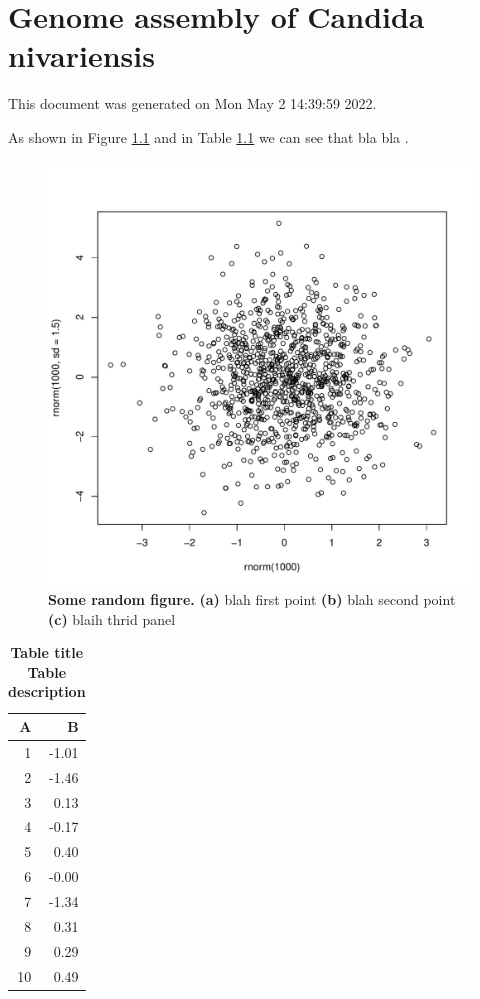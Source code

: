 \chapter{Genome assembly of Candida nivariensis}
\label{chap:rnw}





This document was generated on Mon May  2 14:39:59 2022.

As shown in Figure \ref{fig:myfig} and in Table \ref{tab:rtab1} we can see that bla bla \citep{B}.


\begin{figure}[!ht]
\centering
\includegraphics[width = 1\linewidth,keepaspectratio]{figure/myfig.pdf}
\caption[Some random figure]{{\bf Some random figure.} {\bf (a)} blah first point {\bf (b)} blah second point {\bf (c)} blaih thrid panel  }
\label{fig:myfig}
\end{figure}




\begin{table}[ht]
\centering
\begin{tabular}{rr}
  \hline
A & B \\ 
  \hline
  1 & -1.01 \\ 
    2 & -1.46 \\ 
    3 & 0.13 \\ 
    4 & -0.17 \\ 
    5 & 0.40 \\ 
    6 & -0.00 \\ 
    7 & -1.34 \\ 
    8 & 0.31 \\ 
    9 & 0.29 \\ 
   10 & 0.49 \\ 
   \hline
\end{tabular}
\caption{\bf{ Table title } Table description} 
\label{tab:rtab1}
\end{table}

